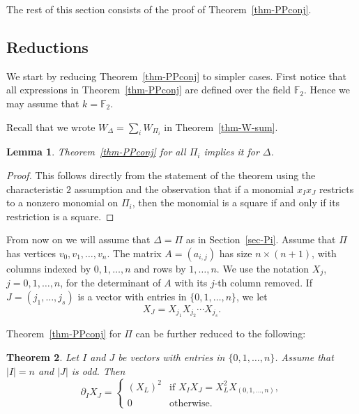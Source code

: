 \documentclass[10pt]{article}
\newtheorem{theorem}{Theorem}[section]
\newtheorem{lemma}[theorem]{Lemma}
\theoremstyle{definition}
\newcommand{\FF}{{\mathbb{F}}}
\renewcommand{\a}[1]{a_{#1}}
\begin{document}
The rest of this section consists of the proof of Theorem~\ref{thm-PPconj}.

\subsection{Reductions} We start by reducing Theorem~\ref{thm-PPconj} to simpler cases. First notice that all expressions in Theorem~\ref{thm-PPconj} are defined over the field $\FF_2$. Hence we may assume that $k=\FF_2$. 

Recall that we wrote $W_\Delta = \sum_i W_{\Pi_i}$ in Theorem~\ref{thm-W-sum}. 

\begin{lemma} \label{lem-redPi}
Theorem~\ref{thm-PPconj} for all $\Pi_i$ implies it for $\Delta$.
\end{lemma}

\begin{proof}
This follows directly from the statement of the theorem using the characteristic $2$ assumption and the  observation that if a monomial $x_Ix_J$ restricts to a nonzero monomial on $\Pi_i$, then the monomial is a square if and only if its restriction is a square.
\end{proof}

From now on we will assume that $\Delta = \Pi$ as in Section~\ref{sec-Pi}. Assume that $\Pi$ has vertices $v_0, v_1, \ldots, v_n$. The matrix $A=(\a{i, j})$ has size $n\times (n+1)$, with columns indexed by $0,1,\ldots,n$ and rows by $1,\ldots,n$. We use the notation $X_j$, $j=0,1,\ldots,n$, for the determinant of $A$ with its $j$-th column removed. If $J= (j_1, \ldots, j_s)$ is a vector with entries in $\{0,1,\ldots,n\}$, we let
\[ X_J = X_{j_1} X_{j_2} \cdots X_{j_s}.\]

Theorem~\ref{thm-PPconj} for $\Pi$ can be further reduced to the following:

\begin{theorem} \label{thm-simplest}
Let $I$ and $J$ be vectors with entries in $\{0,1,\dots,n\}$. Assume that $|I|=n$ and $|J|$ is odd.  Then
  \[ \partial_I  X_J  = 
  \begin{cases}
    (X_L)^2 & \text{if $X_I X_J = X_L^2 X_{(0,1,\dots,n)}$}, \\
    0         &  \text{otherwise.}
  \end{cases}\]
\end{theorem}
\end{document}
